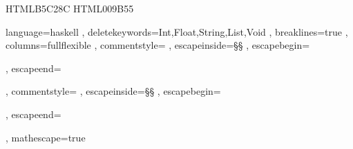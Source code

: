 \usepackage{xcolor}
\definecolor{YellowGreen} {HTML}{B5C28C}
\definecolor{ForestGreen} {HTML}{009B55}


\usepackage{xltxtra} %
\usepackage{polyglossia}
\setmainlanguage{russian}

\let\cyrillicfonttt\monofamily

\newfontfamily{}
\newfontfamily{}

\usepackage{listings}
{ language=haskell
         , deletekeywords={Int,Float,String,List,Void}
         , breaklines=true
         , columns=fullflexible
         , commentstyle=\color{ForestGreen}
         , escapeinside=§§
         , escapebegin=\begin{russian}\commentfont
         , escapeend=\end{russian}
         , commentstyle=\color{ForestGreen}
         , escapeinside=§§
         , escapebegin=\begin{russian}\color{ForestGreen}
         , escapeend=\end{russian}
         , mathescape=true
}

